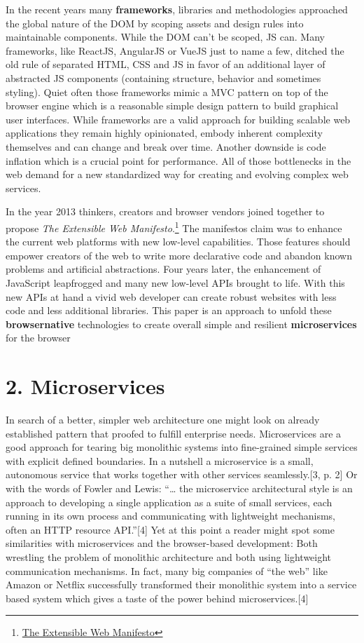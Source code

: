 \documentclass[]{article}
\begin{document}
In the recent years many \textbf{frameworks}, libraries and
methodologies approached the global nature of the DOM by scoping assets
and design rules into maintainable components. While the DOM can't be
scoped, JS can. Many frameworks, like ReactJS, AngularJS or VueJS just
to name a few, ditched the old rule of separated HTML, CSS and JS in
favor of an additional layer of abstracted JS components (containing
structure, behavior and sometimes styling). Quiet often those frameworks
mimic a MVC pattern on top of the browser engine which is a reasonable
simple design pattern to build graphical user interfaces. While
frameworks are a valid approach for building scalable web applications
they remain highly opinionated, embody inherent complexity themselves
and can change and break over time. Another downside is code inflation
which is a crucial point for performance. All of those bottlenecks in
the web demand for a new standardized way for creating and evolving
complex web services.

In the year 2013 thinkers, creators and browser vendors joined together
to propose \emph{The Extensible Web Manifesto}.\footnote{\href{https://extensiblewebmanifesto.org/}{The
  Extensible Web Manifesto}} The manifestos claim was to enhance the
current web platforms with new low-level capabilities. Those features
should empower creators of the web to write more declarative code and
abandon known problems and artificial abstractions. Four years later,
the enhancement of JavaScript leapfrogged and many new low-level APIs
brought to life. With this new APIs at hand a vivid web developer can
create robust websites with less code and less additional libraries.
This paper is an approach to unfold these \textbf{browsernative}
technologies to create overall simple and resilient
\textbf{microservices} for the browser

\section{2. Microservices}\label{microservices}

In search of a better, simpler web architecture one might look on
already established pattern that proofed to fulfill enterprise needs.
Microservices are a good approach for tearing big monolithic systems
into fine-grained simple services with explicit defined boundaries. In a
nutshell a microservice is a small, autonomous service that works
together with other services seamlessly.{[}3, p. 2{]} Or with the words
of Fowler and Lewis: ``\ldots{} the microservice architectural style is
an approach to developing a single application as a suite of small
services, each running in its own process and communicating with
lightweight mechanisms, often an HTTP resource API.''{[}4{]} Yet at this
point a reader might spot some similarities with microservices and the
browser-based development: Both wrestling the problem of monolithic
architecture and both using lightweight communication mechanisms. In
fact, many big companies of ``the web'' like Amazon or Netflix
successfully transformed their monolithic system into a service based
system which gives a taste of the power behind microservices.{[}4{]}
\end{document}
